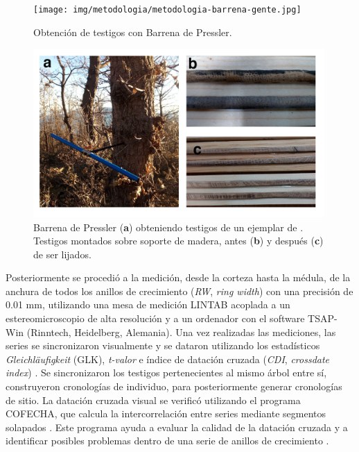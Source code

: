 \begin{figure}
    \centering
    \texttt{[image: img/metodologia/metodologia-barrena-gente.jpg]}
    \caption{Obtención de testigos con Barrena de Pressler.}
    \label{fig:metodologia:barrena-gente}
\end{figure}

\begin{figure}
    \centering
    \includegraphics[width=0.99\textwidth]{img/metodologia/metodologia-cores-combina.jpg}
    \caption{Barrena de Pressler (\textbf{a}) obteniendo testigos de un ejemplar de \Qpy. Testigos montados sobre soporte de madera, antes (\textbf{b}) y después (\textbf{c}) de ser lijados.}
    \label{fig:metodologia:cores-combina}
\end{figure}

Posteriormente se procedió a la medición, desde la corteza hasta la médula, de la anchura de todos los anillos de crecimiento (\emph{RW}, \emph{ring width}) con una precisión de 0.01 mm, utilizando una mesa de medición LINTAB acoplada a un estereomicroscopio de alta resolución y a un ordenador con el software TSAP-Win (Rinntech, Heidelberg, Alemania). Una vez realizadas las mediciones, las series se sincronizaron visualmente y se dataron utilizando los estadísticos \emph{Gleichläufigkeit} (GLK), \emph{t-valor} e índice de datación cruzada (\emph{CDI}, \emph{crossdate index}) \autocite{Schweingruber1988TreeRings,BurasWilmking2015CorrectingCalculation}. Se sincronizaron los testigos pertenecientes al mismo árbol entre sí, construyeron cronologías de individuo, para posteriormente generar cronologías de sitio. La datación cruzada visual se verificó utilizando el programa COFECHA, que calcula la intercorrelación entre series mediante segmentos solapados \autocite{Holmes1983ComputerassistedQuality}. Este programa ayuda a evaluar la calidad de la datación cruzada y a identificar posibles problemas dentro de una serie de anillos de crecimiento \autocite{GrissinoMayer2001EvaluatingCrossdating}.

